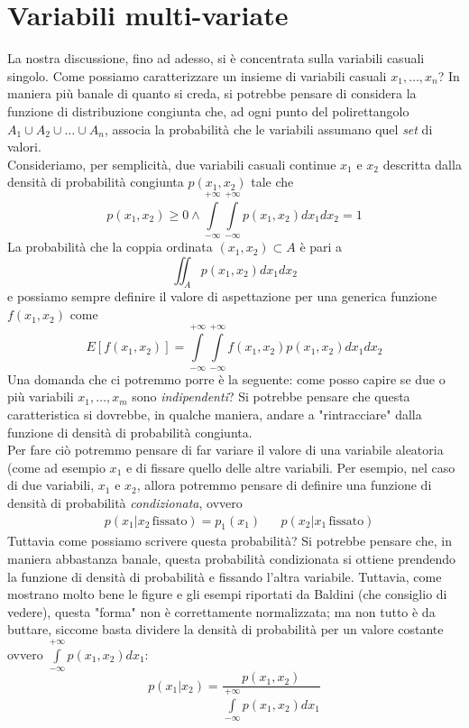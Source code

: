 \documentclass{report}
\begin{document}
\section{Variabili multi-variate}
La nostra discussione, fino ad adesso, si è concentrata sulla variabili casuali singolo. Come possiamo caratterizzare un insieme di variabili casuali $x_1, \dots, x_n$? In maniera più banale di quanto si creda, si potrebbe pensare di considera la funzione di distribuzione congiunta che, ad ogni punto del polirettangolo $A_1 \cup A_2 \cup \dots \cup A_n$, associa la probabilità che le variabili assumano quel \emph{set} di valori. \\
Consideriamo, per semplicità, due variabili casuali continue $x_1$ e $x_2$ descritta dalla densità di probabilità congiunta $p(x_1, x_2)$ tale che
\begin{equation}
	p(x_1, x_2) \geq 0 \wedge \int\limits_{-\infty}^{+\infty} \int\limits_{-\infty}^{+\infty} p(x_1, x_2) dx_1dx_2 = 1
\end{equation}
La probabilità che la coppia ordinata $(x_1, x_2) \subset A$ è pari a
\begin{equation}
	\iint_A p(x_1, x_2) dx_1dx_2
\end{equation}
e possiamo sempre definire il valore di aspettazione per una generica funzione $f(x_1, x_2)$ come
\begin{equation}
	E[f(x_1, x_2)] = \int\limits_{-\infty}^{+\infty} \int\limits_{-\infty}^{+\infty} f(x_1, x_2)p(x_1, x_2)dx_1dx_2
\end{equation}
Una domanda che ci potremmo porre è la seguente: come posso capire se due o più variabili $x_1, \dots, x_m$ sono \emph{indipendenti}? Si potrebbe pensare che questa caratteristica si dovrebbe, in qualche maniera, andare a "rintracciare" dalla funzione di densità di probabilità congiunta. \\ Per fare ciò potremmo pensare di far variare il valore di una variabile aleatoria (come ad esempio $x_1$ e di fissare quello delle altre variabili. Per esempio, nel caso di due variabili, $x_1$ e $x_2$, allora potremmo pensare di definire una funzione di densità di probabilità \emph{condizionata}, ovvero
\begin{align*}
	&p(x_1 | x_2 \, \text{fissato}) = p_1(x_1) & &p(x_2 | x_1 \, \text{fissato})
\end{align*}
Tuttavia come possiamo scrivere questa probabilità? Si potrebbe pensare che, in maniera abbastanza banale, questa probabilità condizionata si ottiene prendendo la funzione di densità di probabilità e fissando l'altra variabile. Tuttavia, come mostrano molto bene le figure e gli esempi riportati da Baldini (che consiglio di vedere), questa "forma" non è correttamente normalizzata; ma non tutto è da buttare, siccome basta dividere la densità di probabilità per un valore costante ovvero $\int\limits_{-\infty}^{+\infty} p(x_1, x_2)dx_1$:
\begin{equation*}
	p(x_1 | x_2) = \frac{p(x_1, x_2)}{ \int\limits_{-\infty}^{+\infty} p(x_1, x_2) dx_1 }
\end{equation*}
\end{document}
